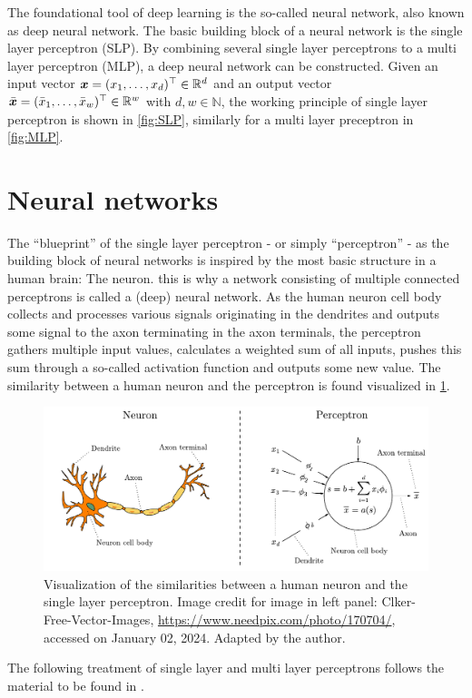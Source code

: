 \documentclass[a4paper,12pt]{report}
\def\lk#1{{\color{black}{#1}}}
\begin{document}
The foundational tool of deep learning is the so-called neural network, also known as deep neural network. The basic building block of a neural network is the single layer perceptron (SLP). By combining several single layer perceptrons to a multi layer perceptron (MLP), a deep neural network can be constructed. Given an input vector $\bm{x} = (x_1, \dots, x_d)^\top \in\mathbb{R}^d$ and an output vector $\bar{\bm{x}} = (\bar{x}_1,\dots,\bar{x}_w)^\top \in \mathbb{R}^w$ with $d,w \in \mathbb{N}$, the working principle of \lk{a} single layer perceptron is shown in \cref{fig:SLP}, similarly for a multi layer preceptron in \cref{fig:MLP}.

\section{Neural networks}
The ``blueprint'' of the single layer perceptron - or simply ``perceptron'' - as the building block of neural networks is inspired by the most basic structure in a human brain: The neuron. this is why a network consisting of multiple connected perceptrons is called a (deep) neural network. As the human neuron cell body collects and processes various signals originating in the dendrites and outputs some signal to the axon terminating in the axon terminals, the perceptron gathers multiple input values, calculates a weighted sum of all inputs, pushes this sum through a so-called activation function and outputs some new value. The similarity between a human neuron and the perceptron is found visualized in \cref{fig:neuronperceptron}. 
\begin{figure}[h]
\centering
\includegraphics[width=\textwidth]{figures/neuronperceptron.pdf}
\caption{Visualization of the similarities between a human neuron and the single layer perceptron. Image credit for image in left panel: Clker-Free-Vector-Images, \url{https://www.needpix.com/photo/170704/}, accessed on January 02, 2024. Adapted by the author.}
\label{fig:neuronperceptron}
\end{figure}
The following treatment of single layer and multi layer perceptrons follows the material to be found in \cite[p.338-342]{Raschka.2022}.
\end{document}
